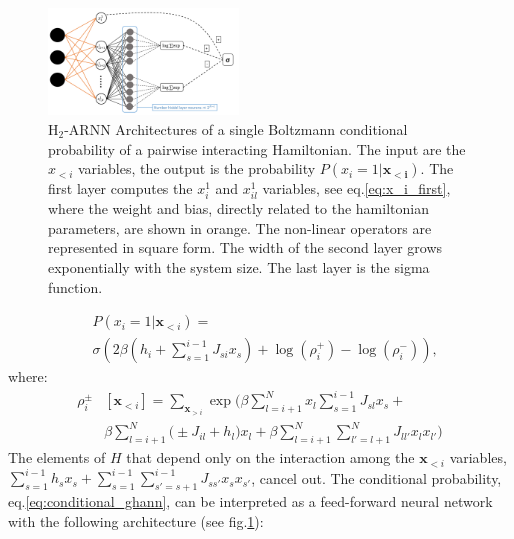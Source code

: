 \documentclass[aps,physrev,10pt,floatfix,reprint]{revtex4-2}
\begin{document}
\begin{figure}[!ht]
    \includegraphics[width=0.45\textwidth]{img/h2ARNN.pdf}
    \caption{H$_2$-ARNN Architectures of a single Boltzmann conditional probability of a pairwise interacting Hamiltonian. The input are the $x_{<i}$ variables, the output is the probability $P(x_i=1 | \mathbf{x_{<i}})$. The first layer computes the $x^1_i$ and $x^1_{il}$ variables, see eq.\ref{eq:x_i_first}, where the weight and bias, directly related to the hamiltonian parameters, are shown in orange. The non-linear operators are represented in square form. The width of the second layer grows exponentially with the system size. The last layer is the sigma function.}
    \label{fig:arch}
\end{figure}
\begin{equation}
    \label{eq:conditional_ghann}
    \begin{split}
    & P\left(x_{i}=1|\mathbf{x}_{<i}\right) = \\
    & \sigma\left( 2 \beta \left(h_i + \sum_{s=1}^{i-1} J_{si} x_s\right) +\log(\rho_i^+) - \log(\rho_i^-)
    \right),   
    \end{split}
\end{equation}
where:
\begin{equation}
    \begin{split}
    \rho_i^{\pm}&[\mathbf{x}_{<i}]  = \sum_{\mathbf{x}_{>i}}  \exp \bigg(
    \beta\sum_{l=i+1}^{N} x_l \sum_{s=1}^{i-1} J_{sl} x_s +\\
    &\beta\sum_{l=i+1}^{N}\big( \pm J_{il}  + h_l \big) x_l 
    + \beta\sum_{l=i+1}^{N}\sum_{l'=l+1}^{N} J_{ll'} x_l x_{l'} \bigg)
\end{split}
\label{eq:rho_ghann}
\end{equation}
The elements of $H$ that depend only on the interaction among the $\mathbf{x}_{<i}$ variables, $\sum_{s=1}^{i-1} h_s x_s + \sum_{s=1}^{i-1}\sum_{s'=s+1}^{i-1} J_{ss'} x_{s} x_{s'}$, cancel out.
The conditional probability, eq.\ref{eq:conditional_ghann}, can be interpreted as a feed-forward neural network with the following architecture (see fig.\ref{fig:arch}):
\end{document}
